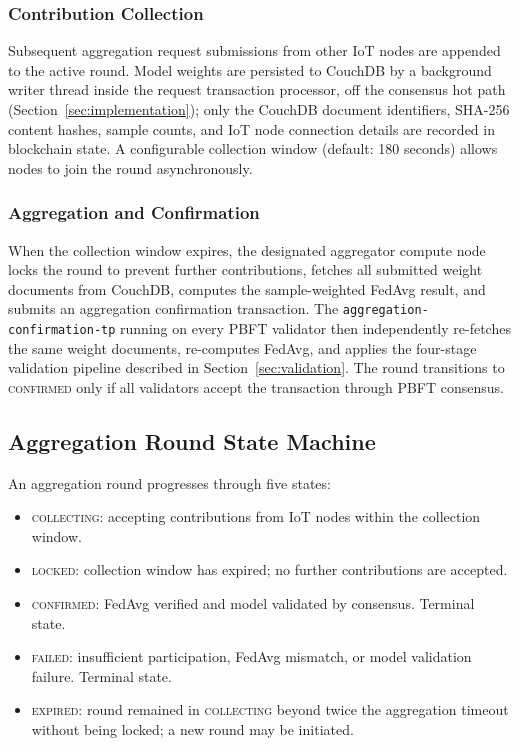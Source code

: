 \documentclass[lettersize,journal]{IEEEtran}
\begin{document}
\subsubsection{Contribution Collection}

Subsequent aggregation request submissions from other IoT nodes are appended to the active
round. Model weights are persisted to CouchDB by a background writer thread inside the
request transaction processor, off the consensus hot path
(Section~\ref{sec:implementation}); only the CouchDB document identifiers, SHA-256 content
hashes, sample counts, and IoT node connection details are recorded in blockchain state. A
configurable collection window (default: 180 seconds) allows nodes to join the round
asynchronously.

\subsubsection{Aggregation and Confirmation}

When the collection window expires, the designated aggregator compute node locks the round
to prevent further contributions, fetches all submitted weight documents from CouchDB,
computes the sample-weighted FedAvg result, and submits an aggregation confirmation
transaction. The \texttt{aggregation-confirmation-tp} running on every PBFT validator then
independently re-fetches the same weight documents, re-computes FedAvg, and applies the
four-stage validation pipeline described in Section~\ref{sec:validation}. The round
transitions to \textsc{confirmed} only if all validators accept the transaction through
PBFT consensus.

\subsection{Aggregation Round State Machine}

An aggregation round progresses through five states:

\begin{itemize}
    \item \textsc{collecting}: accepting contributions from IoT nodes within the
    collection window.
    \item \textsc{locked}: collection window has expired; no further contributions are
    accepted.
    \item \textsc{confirmed}: FedAvg verified and model validated by consensus. Terminal
    state.
    \item \textsc{failed}: insufficient participation, FedAvg mismatch, or model
    validation failure. Terminal state.
    \item \textsc{expired}: round remained in \textsc{collecting} beyond twice the
    aggregation timeout without being locked; a new round may be initiated.
\end{itemize}
\end{document}
